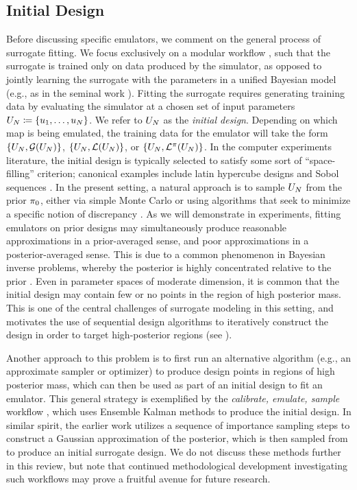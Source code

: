 \documentclass[12pt]{article}
\begin{document}
\subsection{Initial Design}
Before discussing specific emulators, we comment on the general process of surrogate fitting.
We focus exclusively on a modular workflow \citep{modularization}, such that the surrogate is
 trained only on data produced
by the simulator, as opposed to jointly learning the surrogate with the parameters in a 
unified Bayesian model (e.g., as in the seminal work \citet{KOH}). Fitting the surrogate requires 
generating training data by evaluating the simulator at a chosen set of input parameters
$U_{N} \coloneqq \{u_1, \dots, u_{N}\}$. We refer to $U_{N}$ as the \textit{initial design}.
Depending on which map is being emulated, the training data for the emulator will take the form 
$\{U_{N}, \mathcal{G}(U_{N})\}$, $\{U_{N}, \mathcal{L}(U_{N})\}$, or $\{U_{N}, \mathcal{L}^{\pi}(U_{N})\}$. 
In the computer experiments literature, 
the initial design is typically selected to satisfy some sort of ``space-filling'' criterion; canonical examples 
include latin hypercube designs and Sobol sequences \citep{initDesignReview}. In the present setting, a natural 
approach is to sample $U_{N}$ from the prior $\pi_0$, either via simple Monte Carlo or using 
algorithms that seek to minimize a specific notion of discrepancy \citep{supportPoints, SteinPoints}.
As we will demonstrate in experiments, fitting emulators on prior designs may simultaneously produce 
reasonable approximations in a prior-averaged sense, and poor approximations in a posterior-averaged
sense. This is due to a common phenomenon in Bayesian inverse problems, whereby the posterior is highly 
concentrated relative to the prior \citep{StuartTeck2,PCEBIP}. Even in parameter spaces of moderate dimension, 
it is common that the initial design may contain few or no points in the region of high posterior mass. 
This is one of the central challenges of surrogate modeling in this setting, and motivates the use of sequential 
design algorithms to iteratively construct the design in order to target high-posterior regions (see ).

Another approach to this problem is to first run an alternative algorithm (e.g., an approximate 
sampler or optimizer) to produce design points in regions of high posterior mass, which can then 
be used as part of an initial design to fit an emulator. This general strategy is exemplified by the 
\textit{calibrate, emulate, sample} workflow \citep{CES,idealizedGCM,CESSoftware,FATES_CES,adaptiveMultimodal}, 
which uses Ensemble Kalman methods to produce the initial design. In similar spirit, the earlier work 
\citet{emPostDens} utilizes a sequence of importance sampling steps to construct a Gaussian 
approximation of the posterior, which is then sampled from to produce an initial surrogate design.
We do not discuss these methods further in this review, but note that continued methodological 
development investigating such workflows may prove a fruitful avenue for future research. 
\end{document}
